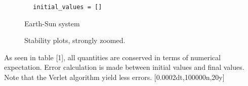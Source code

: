 \begin{verbatim}
        initial_values = []
\end{verbatim}
\begin{figure}[h]
  \centering
  \caption{Earth-Sun system}
  \hfill
\end{figure}
\begin{figure}[h]
  \centering
   \caption{Stability plots, strongly zoomed.}
  \hfill
\end{figure}
\begin{table}[h]
\caption{Conservation errors} %
\centering %
\label{table:nonlin} %
\end{table}
As seen in table [1], all quantities are conserved in terms of numerical expectation. Error calculation is made between initial values and final values.\\ Note that the Verlet algorithm yield less errors. [0.0002dt,100000n,20y]
\\
